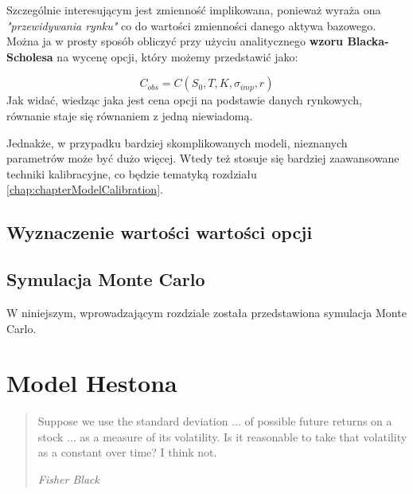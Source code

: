 \documentclass{pracamgr}
\begin{document}
Szczególnie interesującym jest zmienność implikowana, ponieważ wyraża ona \textit{"przewidywania rynku"} co 
do wartości zmienności danego aktywa bazowego. 
Można ja w prosty sposób obliczyć przy użyciu analitycznego \textbf{wzoru Blacka-Scholesa} na wycenę opcji, który 
możemy przedstawić jako:

\begin{equation}
  C_{obs} = C(S_0, T, K, \sigma_{imp}, r)
\end{equation}
Jak widać, wiedząc jaka jest cena opcji na podstawie danych rynkowych, równanie staje się równaniem z jedną niewiadomą. 

Jednakże, w przypadku bardziej skomplikowanych modeli, nieznanych parametrów może być dużo więcej. Wtedy też 
stosuje się bardziej zaawansowane techniki kalibracyjne, co będzie tematyką rozdziału \ref{chap:chapterModelCalibration}.


\section{Wyznaczenie wartości wartości opcji}

 
\section{Symulacja Monte Carlo}


W niniejszym, wprowadzającym rozdziale została przedstawiona symulacja Monte Carlo.




 




%
%
\chapter{Model Hestona}
\label{chap:hestonModel}
\begin{quote}
  Suppose we use the standard deviation ... of possible future returns on
  a stock ... as a measure of its volatility. Is it reasonable to take
  that volatility as a constant over time? I think not.

\raggedleft\slshape Fisher Black 
\end{quote}
\end{document}
